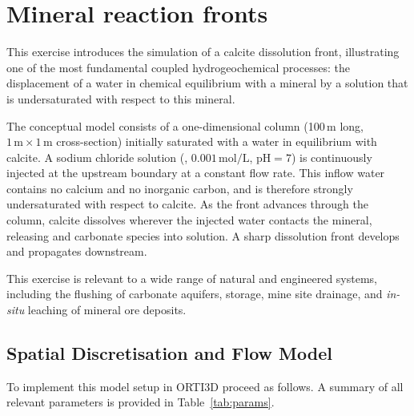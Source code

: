 \chapter{Mineral reaction fronts}

This exercise introduces the simulation of a calcite dissolution front, illustrating one of the most
fundamental coupled hydrogeochemical processes: the displacement of a
water in chemical equilibrium with a mineral by a solution that is undersaturated with respect to this mineral.

The conceptual model consists of a one-dimensional column (100\,m long,
$1\,\mathrm{m} \times 1\,\mathrm{m}$ cross-section) initially saturated
with a water in equilibrium with calcite.  A sodium chloride solution
(, $0.001\,\mathrm{mol/L}$, $\mathrm{pH} = 7$) is continuously
injected at the upstream boundary at a constant flow rate.  This inflow
water contains no calcium and no inorganic carbon, and is therefore
strongly undersaturated with respect to calcite.  As the  front
advances through the column, calcite dissolves wherever the injected
water contacts the mineral, releasing  and carbonate species
into solution.  A sharp dissolution front develops and propagates
downstream.

This exercise is relevant to a wide range of natural and engineered
systems, including the flushing of carbonate aquifers,  storage,
mine site drainage, and \textit{in-situ} leaching of mineral ore deposits.

\section{Spatial Discretisation and Flow Model}

To implement this model setup in ORTI3D proceed as follows.  A summary
of all relevant parameters is provided in Table~\ref{tab:params}.

